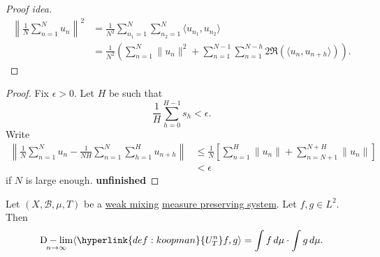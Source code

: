 \documentclass{article}
\DeclareMathOperator*{\dlim}{D-lim}
\begin{document}
\color{gray}
\begin{proof}[Proof idea]
  \begin{align*}
    \left\lVert \frac{1}{N} \sum_{n=1}^N u_n \right\rVert^2 &= \frac{1}{N^2} \sum_{n_1=1}^N \sum_{n_2=1}^N \langle u_{n_1}, u_{n_2} \rangle \\
                                                            &= \frac{1}{N^2} \left(\sum_{n=1}^N \|u_n\|^2 + \sum_{n=1}^{N-1} \sum_{n=1}^{N-h} 2 \Re(\langle u_n, u_{n+h} \rangle)\right).
  \end{align*}
\end{proof}
\begin{proof}
  Fix $\epsilon > 0$. Let $H$ be such that
  \begin{equation*}
    \frac{1}{H} \sum_{h=0}^{H-1} s_h < \epsilon.
  \end{equation*}
  Write
  \begin{align*}
    \left\| \frac{1}{N} \sum_{n=1}^N u_n - \frac{1}{NH} \sum_{n=1}^N \sum_{h=1}^H u_{n+h} \right\| &\leq \frac{1}{N} \left[\sum_{n=1}^H \|u_n\| + \sum_{n=N+1}^{N+H} \|u_n\|\right] \\
                                                                                                   &< \epsilon
  \end{align*}
  if $N$ is large enough.
  \textbf{unfinished}
\end{proof}
\begin{lemma}
  Let $(X, \mathcal{B}, \mu, T)$ be a \hyperlink{def:wMixing}{weak mixing} \hyperlink{def:mps}{measure preserving system}.
  Let $f,g \in L^2$. Then
  \begin{equation*}
    \dlim_{n \to \infty} \langle \hyperlink{def:koopman}{U_T^n} f, g \rangle = \int f \, d\mu \cdot \int g \, d\mu.
  \end{equation*}
\end{lemma}
\end{document}
